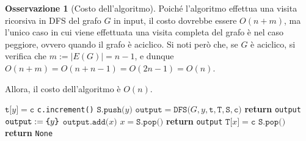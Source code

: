 \documentclass[14pt]{extreport}
\theoremstyle{definition}
\theoremstyle{definition}
\newtheorem{remark}{Osservazione}[subsection]
\begin{document}
\begin{remark}[Costo dell'algoritmo]
    Poiché l'algoritmo effettua una visita ricorsiva in DFS del grafo $G$ in input, il costo dovrebbe essere $O(n + m)$, ma l'unico caso in cui viene effettuata una visita completa del grafo è nel caso peggiore, ovvero quando il grafo è aciclico. Si noti però che, se $G$ è aciclico, si verifica che $m := |E(G)| = n - 1$, e dunque $O(n + m) = O(n + n - 1) = O(2n - 1) = O(n)$.

    Allora, il costo dell'algoritmo è $O(n)$.
\end{remark}

\begin{algorithm}[H]
    \caption{
        Dato un grafo diretto $G$, rappresentato attraverso liste di adiacenza, l'algoritmo restituisce un suo ciclo, se presente.\\
        \textbf{Input}: $G$ grafo diretto, rappresentato attraverso liste di adiacenza.\\
        \textbf{Output}: un ciclo di $G$, se presente.
    }

    \begin{algorithmic}[1]
        \label{findCycleDir}
                    \State $\texttt{t[}y\texttt{]} = \texttt{c}$
                    \State \texttt{c.increment()}
                    \State $\texttt{S.push(}y\texttt{)}$
                    \State $\texttt{output} = \texttt{DFS(}G, y, \texttt{t}, \texttt{T}, \texttt{S}, \texttt{c)}$
                        \State \textbf{return} \texttt{output}
                    \EndIf
                    \State $\texttt{output} := \verb|{| y \verb|}|$ 
                        \State $\texttt{output.add(}x\texttt{)}$
                        \State $x = \texttt{S.pop()}$
                    \EndWhile
                    \State \textbf{return} \texttt{output}
                \EndIf
            \EndFor
            \State $\texttt{T[}x\texttt{]} = \texttt{c}$
            \State $\texttt{S.pop()}$
            \State \textbf{return} \texttt{None}
        \EndFunction
    \end{algorithmic}
\end{algorithm}
\end{document}
